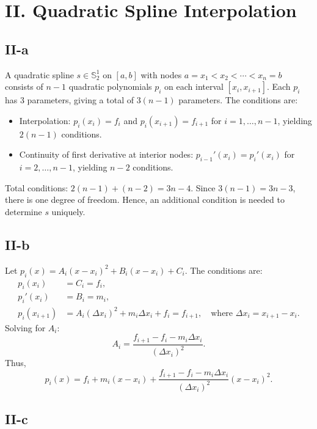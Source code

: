 \documentclass[a4paper]{article}
\begin{document}
\section*{II. Quadratic Spline Interpolation}

\subsection*{II-a}

A quadratic spline \( s \in \mathbb{S}_2^1 \) on \([a, b]\) with nodes \( a = x_1 < x_2 < \cdots < x_n = b \) consists of \( n-1 \) quadratic polynomials \( p_i \) on each interval \([x_i, x_{i+1}]\). Each \( p_i \) has 3 parameters, giving a total of \( 3(n-1) \) parameters. The conditions are:
\begin{itemize}
    \item Interpolation: \( p_i(x_i) = f_i \) and \( p_i(x_{i+1}) = f_{i+1} \) for \( i = 1, \dots, n-1 \), yielding \( 2(n-1) \) conditions.
    \item Continuity of first derivative at interior nodes: \( p_{i-1}'(x_i) = p_i'(x_i) \) for \( i = 2, \dots, n-1 \), yielding \( n-2 \) conditions.
\end{itemize}
Total conditions: \( 2(n-1) + (n-2) = 3n - 4 \). Since \( 3(n-1) = 3n - 3 \), there is one degree of freedom. Hence, an additional condition is needed to determine \( s \) uniquely.

\subsection*{II-b}

Let \( p_i(x) = A_i (x - x_i)^2 + B_i (x - x_i) + C_i \). The conditions are:
\begin{align*}
    p_i(x_i) &= C_i = f_i, \\
    p_i'(x_i) &= B_i = m_i, \\
    p_i(x_{i+1}) &= A_i (\Delta x_i)^2 + m_i \Delta x_i + f_i = f_{i+1}, \quad \text{where } \Delta x_i = x_{i+1} - x_i.
\end{align*}
Solving for \( A_i \):
\[
A_i = \frac{f_{i+1} - f_i - m_i \Delta x_i}{(\Delta x_i)^2}.
\]
Thus,
\[
p_i(x) = f_i + m_i (x - x_i) + \frac{f_{i+1} - f_i - m_i \Delta x_i}{(\Delta x_i)^2} (x - x_i)^2.
\]

\subsection*{II-c}
\end{document}
